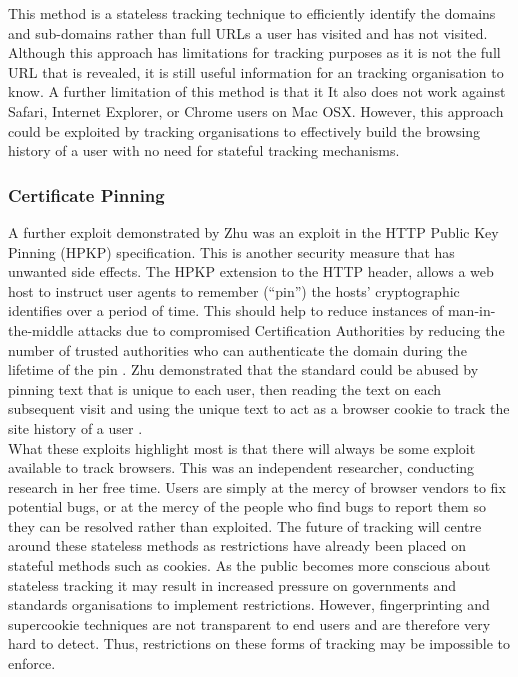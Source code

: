 \documentclass[12pt]{article}
\begin{document}
This method is a stateless tracking technique to efficiently identify the domains and sub-domains rather than full URLs a user has visited and has not visited. Although this approach has limitations for tracking purposes as it is not the full URL that is revealed, it is still useful information for an tracking organisation to know. A further limitation of this method is that it It also does not work against Safari, Internet Explorer, or Chrome users on Mac OSX. However, this approach could be exploited by tracking organisations to effectively build the browsing history of a user with no need for stateful tracking mechanisms. 

\subsubsection{Certificate Pinning}
A further exploit demonstrated by Zhu was an exploit in the HTTP Public Key Pinning (HPKP) specification. This is another security measure that has unwanted side effects. The HPKP extension to the HTTP header, allows a web host to instruct user agents to remember (``pin'') the hosts' cryptographic identifies over a period of time. This should help to reduce instances of man-in-the-middle attacks due to compromised Certification Authorities by reducing the number of trusted authorities who can authenticate the domain during the lifetime of the pin \parencite{HPKP}. Zhu demonstrated that the standard could be abused by pinning text that is unique to each user, then reading the text on each subsequent visit and using the unique text to act as a browser cookie to track the site history of a user \parencite{newTracking}. \\

What these exploits highlight most is that there will always be some exploit available to track browsers. This was an independent researcher, conducting research in her free time. Users are simply at the mercy of browser vendors to fix potential bugs, or at the mercy of the people who find bugs to report them so they can be resolved rather than exploited. The future of tracking will centre around these stateless methods as restrictions have already been placed on stateful methods such as cookies. As the public becomes more conscious about stateless tracking it may result in increased pressure on governments and standards organisations to implement restrictions. However, fingerprinting and supercookie techniques are not transparent to end users and are therefore very hard to detect. Thus, restrictions on these forms of tracking may be impossible to enforce. 
\end{document}
